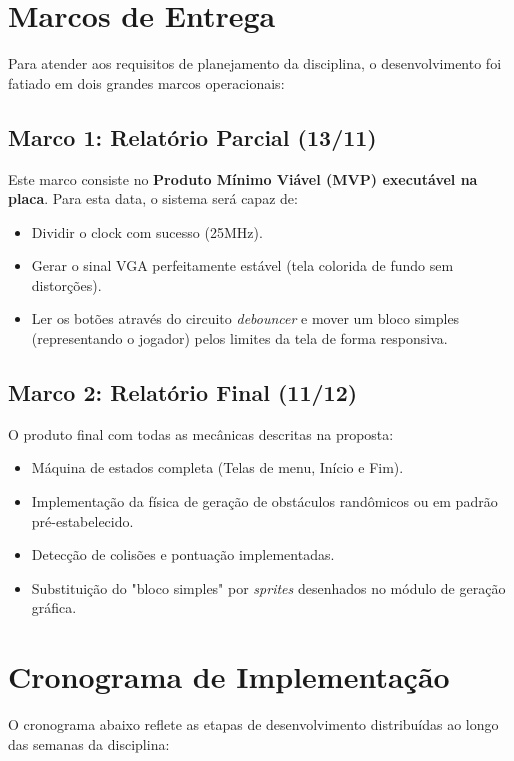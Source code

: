 \documentclass[11pt, a4paper]{article}
\begin{document}
\section{Marcos de Entrega}
Para atender aos requisitos de planejamento da disciplina, o desenvolvimento foi fatiado em dois grandes marcos operacionais:

\subsection{Marco 1: Relatório Parcial (13/11)}
Este marco consiste no \textbf{Produto Mínimo Viável (MVP) executável na placa}. Para esta data, o sistema será capaz de:
\begin{itemize}
    \item Dividir o clock com sucesso (25MHz).
    \item Gerar o sinal VGA perfeitamente estável (tela colorida de fundo sem distorções).
    \item Ler os botões através do circuito \textit{debouncer} e mover um bloco simples (representando o jogador) pelos limites da tela de forma responsiva.
\end{itemize}

\subsection{Marco 2: Relatório Final (11/12)}
O produto final com todas as mecânicas descritas na proposta:
\begin{itemize}
    \item Máquina de estados completa (Telas de menu, Início e Fim).
    \item Implementação da física de geração de obstáculos randômicos ou em padrão pré-estabelecido.
    \item Detecção de colisões e pontuação implementadas.
    \item Substituição do "bloco simples" por \textit{sprites} desenhados no módulo de geração gráfica.
\end{itemize}

\section{Cronograma de Implementação}
O cronograma abaixo reflete as etapas de desenvolvimento distribuídas ao longo das semanas da disciplina:
\end{document}
